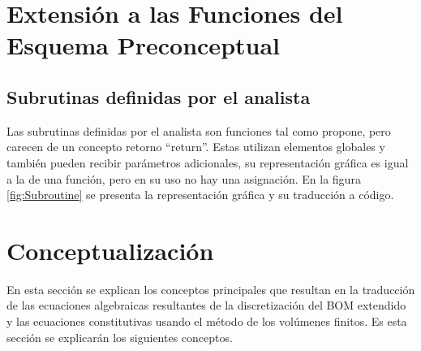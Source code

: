
\section{Extensión a las Funciones del Esquema Preconceptual}\label{sec:PSNew}
\subsection{Subrutinas definidas por el analista}\label{sec:PS_ADS}
Las subrutinas definidas por el analista son funciones tal como \cite{JCalle} propone, pero carecen de un concepto retorno ``return''. Estas utilizan elementos globales y también pueden recibir parámetros adicionales, su representación gráfica es igual a la de una función, pero en su uso no hay una asignación. En la figura \ref{fig:Subroutine} se presenta la representación gráfica y su traducción a código. %

\section{Conceptualización}\label{sec:Concepts}
En esta sección se explican los conceptos principales que resultan en la traducción de las ecuaciones algebraicas resultantes de la discretización del BOM extendido y las ecuaciones constitutivas usando el método de los volúmenes finitos. Es esta sección se explicarán los siguientes conceptos.

